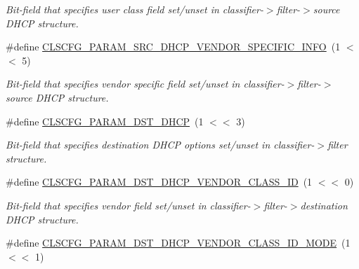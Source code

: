 \begin{DoxyCompactItemize}
\begin{DoxyCompactList}\small\item\em Bit-\/field that specifies user class field set/unset in classifier-\/$>$filter-\/$>$source D\-H\-C\-P structure. \end{DoxyCompactList}\item 
\hypertarget{group__FAPI__QOS__CLASS_ga44e475c1b6e51a6d395d2249252ad1f0}{\#define \hyperlink{group__FAPI__QOS__CLASS_ga44e475c1b6e51a6d395d2249252ad1f0}{C\-L\-S\-C\-F\-G\-\_\-\-P\-A\-R\-A\-M\-\_\-\-S\-R\-C\-\_\-\-D\-H\-C\-P\-\_\-\-V\-E\-N\-D\-O\-R\-\_\-\-S\-P\-E\-C\-I\-F\-I\-C\-\_\-\-I\-N\-F\-O}~(1 $<$$<$ 5)}\label{group__FAPI__QOS__CLASS_ga44e475c1b6e51a6d395d2249252ad1f0}

\begin{DoxyCompactList}\small\item\em Bit-\/field that specifies vendor specific field set/unset in classifier-\/$>$filter-\/$>$source D\-H\-C\-P structure. \end{DoxyCompactList}\item 
\hypertarget{group__FAPI__QOS__CLASS_gacc4d7564ff8092c59fc651f43f91a9c5}{\#define \hyperlink{group__FAPI__QOS__CLASS_gacc4d7564ff8092c59fc651f43f91a9c5}{C\-L\-S\-C\-F\-G\-\_\-\-P\-A\-R\-A\-M\-\_\-\-D\-S\-T\-\_\-\-D\-H\-C\-P}~(1 $<$$<$ 3)}\label{group__FAPI__QOS__CLASS_gacc4d7564ff8092c59fc651f43f91a9c5}

\begin{DoxyCompactList}\small\item\em Bit-\/field that specifies destination D\-H\-C\-P options set/unset in classifier-\/$>$filter structure. \end{DoxyCompactList}\item 
\hypertarget{group__FAPI__QOS__CLASS_gaa7afc34341b4479f37e8ca61d8b4ce04}{\#define \hyperlink{group__FAPI__QOS__CLASS_gaa7afc34341b4479f37e8ca61d8b4ce04}{C\-L\-S\-C\-F\-G\-\_\-\-P\-A\-R\-A\-M\-\_\-\-D\-S\-T\-\_\-\-D\-H\-C\-P\-\_\-\-V\-E\-N\-D\-O\-R\-\_\-\-C\-L\-A\-S\-S\-\_\-\-I\-D}~(1 $<$$<$ 0)}\label{group__FAPI__QOS__CLASS_gaa7afc34341b4479f37e8ca61d8b4ce04}

\begin{DoxyCompactList}\small\item\em Bit-\/field that specifies vendor field set/unset in classifier-\/$>$filter-\/$>$destination D\-H\-C\-P structure. \end{DoxyCompactList}\item 
\hypertarget{group__FAPI__QOS__CLASS_gae2fbe779d7e55ee5a1e393de69300efe}{\#define \hyperlink{group__FAPI__QOS__CLASS_gae2fbe779d7e55ee5a1e393de69300efe}{C\-L\-S\-C\-F\-G\-\_\-\-P\-A\-R\-A\-M\-\_\-\-D\-S\-T\-\_\-\-D\-H\-C\-P\-\_\-\-V\-E\-N\-D\-O\-R\-\_\-\-C\-L\-A\-S\-S\-\_\-\-I\-D\-\_\-\-M\-O\-D\-E}~(1 $<$$<$ 1)}\label{group__FAPI__QOS__CLASS_gae2fbe779d7e55ee5a1e393de69300efe}


\end{DoxyCompactItemize}
